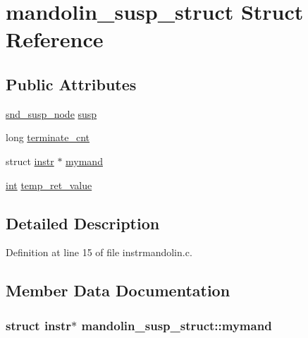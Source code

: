 \hypertarget{structmandolin__susp__struct}{}\section{mandolin\+\_\+susp\+\_\+struct Struct Reference}
\label{structmandolin__susp__struct}
\subsection*{Public Attributes}
\begin{DoxyCompactItemize}
\item 
\hyperlink{sound_8h_a6b268203688a934bd798ceb55f85d4c0}{snd\+\_\+susp\+\_\+node} \hyperlink{structmandolin__susp__struct_a0c2a1633b69d5490178ae12db72348e0}{susp}
\item 
long \hyperlink{structmandolin__susp__struct_a1607d525abfe132301fa36afa75cad7a}{terminate\+\_\+cnt}
\item 
struct \hyperlink{structinstr}{instr} $\ast$ \hyperlink{structmandolin__susp__struct_ab3586b6f5c79c5b13d857cb79f00a2fc}{mymand}
\item 
\hyperlink{xmltok_8h_a5a0d4a5641ce434f1d23533f2b2e6653}{int} \hyperlink{structmandolin__susp__struct_a8dbbb9cc86898df51706f0d8e4bc9578}{temp\+\_\+ret\+\_\+value}
\end{DoxyCompactItemize}


\subsection{Detailed Description}


Definition at line 15 of file instrmandolin.\+c.



\subsection{Member Data Documentation}
\subsubsection[{\texorpdfstring{mymand}{mymand}}]{\setlength{\rightskip}{0pt plus 5cm}struct {\bf instr}$\ast$ mandolin\+\_\+susp\+\_\+struct\+::mymand}\hypertarget{structmandolin__susp__struct_ab3586b6f5c79c5b13d857cb79f00a2fc}{}\label{structmandolin__susp__struct_ab3586b6f5c79c5b13d857cb79f00a2fc}


